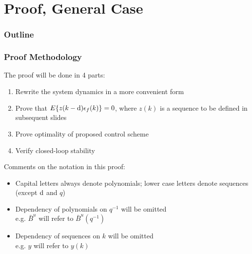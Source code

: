 \section{Proof, General Case}
\begin{frame}
    \frametitle{Outline}
    \tableofcontents[currentsection]
\end{frame}

\begin{frame}
    \frametitle{Proof Methodology}

    The proof will be done in 4 parts:

    \begin{enumerate}
        \item
        Rewrite the system dynamics in a more convenient form
        \pause

        \item
        Prove that $E\{z(k-\textrm{d}) \epsilon_f(k)\} = 0$, where $z(k)$ is a sequence to be defined in subsequent slides
        \pause

        \item
        Prove optimality of proposed control scheme
        \pause

        \item
        Verify closed-loop stability

    \end{enumerate}
    \pause

    Comments on the notation in this proof:
    \begin{itemize}
        \item
        Capital letters always denote polynomials; lower case letters denote sequences (except $\textrm{d}$ and $q$)

        \item
        Dependency of polynomials on $q^{-1}$ will be omitted\\
        e.g. $\bar{B}^u$ will refer to $\bar{B}^u(q^{-1})$

        \item
        Dependency of sequences on $k$ will be omitted\\
        e.g. $y$ will refer to $y(k)$

    \end{itemize}
\end{frame}


